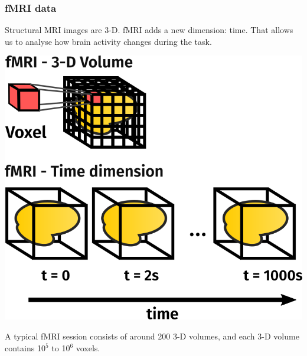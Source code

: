 \documentclass[11pt]{beamer}
\begin{document}
\begin{frame}
    \frametitle{fMRI data}

    Structural MRI images are 3-D. fMRI adds a new dimension: time. That
    allows us to analyse how brain activity changes during the task.

    \begin{center}
        \includegraphics[scale=0.25]{figures/4d_data.png}
    \end{center}

    A typical fMRI session consists of around 200 3-D volumes, and each 3-D
    volume contains 10$^5$ to 10$^6$ voxels.

\end{frame}
\end{document}
